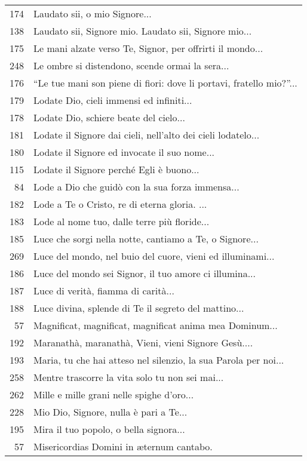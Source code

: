 {\begin{flushleft}
\begin{longtable}{r m{11cm}}
    174 & Laudato sii, o mio Signore...\\
    138 & Laudato sii, Signore mio. Laudato sii, Signore mio...\\
    175 & Le mani alzate verso Te, Signor, per offrirti il mondo...\\
    248 & Le ombre si distendono, scende ormai la sera...\\
    176 & ``Le tue mani son piene di fiori: dove li portavi, fratello mio?''...\\
    179 & Lodate Dio, cieli immensi ed infiniti...\\
    178 & Lodate Dio, schiere beate del cielo...\\
    181 & Lodate il Signore dai cieli, nell'alto dei cieli lodatelo...\\
    180 & Lodate il Signore ed invocate il suo nome...\\
    115 & Lodate il Signore perché Egli è buono...\\
    84 & Lode a Dio che guidò con la sua forza immensa...\\
    182 & Lode a Te o Cristo, re di eterna gloria.  ...\\
    183 & Lode al nome tuo, dalle terre più floride...\\
    185 & Luce che sorgi nella notte, cantiamo a Te, o Signore...\\
    269 & Luce del mondo, nel buio del cuore, vieni ed illuminami...\\
    186 & Luce del mondo sei Signor, il tuo amore ci illumina...\\
    187 & Luce di verità, fiamma di carità...\\
    188 & Luce divina, splende di Te il segreto del mattino...\\
    57 & Magnificat, magnificat, magnificat anima mea Dominum...\\
    192 & Maranathà, maranathà, Vieni, vieni Signore Gesù....\\
    193 & Maria, tu che hai atteso nel silenzio, la sua Parola per noi...\\
    258 & Mentre trascorre la vita solo tu non sei mai...\\
    262 & Mille e mille grani nelle spighe d'oro...\\
    228 & Mio Dio, Signore, nulla è pari a Te...\\
    195 & Mira il tuo popolo, o bella signora...\\
    57 & Misericordias Domini in \ae ternum cantabo.\\

\end{longtable}
\end{flushleft}}
